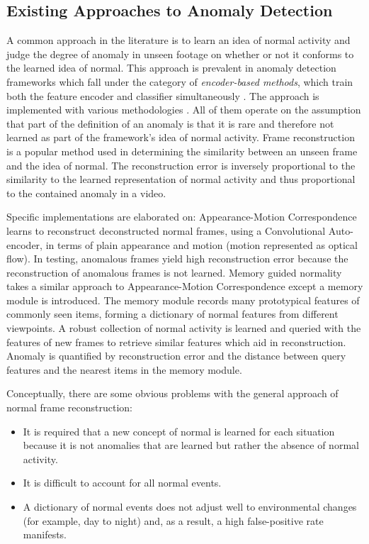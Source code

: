 \documentclass[sigplan,authorversion,nonacm, 9pt]{acmart}
\begin{document}
\subsection{Existing Approaches to Anomaly Detection}
A common approach in the literature is to learn an idea of normal activity and judge the degree of anomaly in unseen footage on whether or not it conforms to the learned idea of normal. This approach is prevalent in anomaly detection frameworks which fall under the category of \textit{encoder-based methods}, which train both the feature encoder and classifier simultaneously \cite{feng}.
The approach is implemented with various methodologies \cite{nguyen} \cite{park} \cite{liu}. All of them operate on the assumption that part of the definition of an anomaly is that it is rare and therefore not learned as part of the framework’s idea of normal activity. Frame reconstruction is a popular method used in determining the similarity between an unseen frame and the idea of normal. The reconstruction error is inversely proportional to the similarity to the learned representation of normal activity and thus proportional to the contained anomaly in a video.
\par
Specific implementations are elaborated on:
Appearance-Motion Correspondence \cite{nguyen} learns to reconstruct deconstructed normal frames, using a Convolutional Auto-encoder, in terms of plain appearance and motion (motion represented as optical flow). In testing, anomalous frames yield high reconstruction error because the reconstruction of anomalous frames is not learned. Memory guided normality \cite{park} takes a similar approach to Appearance-Motion Correspondence except a memory module is introduced. The memory module records many prototypical features of commonly seen items, forming a dictionary of normal features from different viewpoints.
A robust collection of normal activity is learned and queried with the features of new frames to retrieve similar features which aid in reconstruction. 
Anomaly is quantified by reconstruction error and the distance between query features and the nearest items in the memory module.
\par
Conceptually, there are some obvious problems with the general approach of normal frame reconstruction:
\begin{itemize}
    \item It is required that a new concept of normal is learned for each situation because it is not anomalies that are learned but rather the absence of normal activity.
    \item It is difficult to account for all normal events.
    \item A dictionary of normal events does not adjust well to environmental changes (for example, day to night) and, as a result, a high false-positive rate manifests.
\end{itemize}
\end{document}
